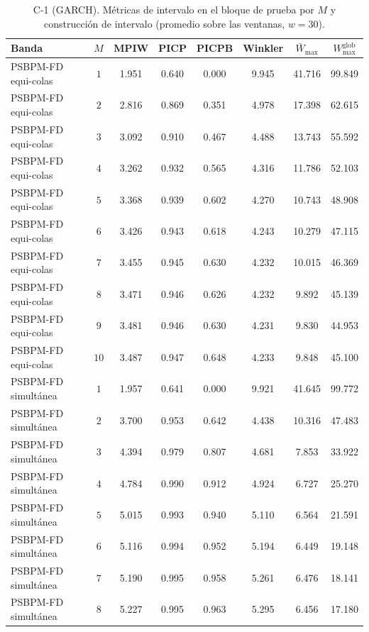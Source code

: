 \begin{table}[H]
\centering\footnotesize
\caption{C-1 (GARCH). Métricas de intervalo en el bloque de prueba por $M$ y construcción de intervalo (promedio sobre las ventanas, $w = 30$).}
\label{tab:aneB_B_C1}
\begin{tabular}{l c cccccc}
\hline
 Banda & $M$ & MPIW & PICP & PICPB & Winkler & $\bar{W}_{\max}$ & $W_{\max}^{\mathrm{glob}}$ \\
\hline
PSBPM-FD equi-colas & $1$ & 1.951 & 0.640 & 0.000 & 9.945 & 41.716 & 99.849 \\
PSBPM-FD equi-colas & $2$ & 2.816 & 0.869 & 0.351 & 4.978 & 17.398 & 62.615 \\
PSBPM-FD equi-colas & $3$ & 3.092 & 0.910 & 0.467 & 4.488 & 13.743 & 55.592 \\
PSBPM-FD equi-colas & $4$ & 3.262 & 0.932 & 0.565 & 4.316 & 11.786 & 52.103 \\
PSBPM-FD equi-colas & $5$ & 3.368 & 0.939 & 0.602 & 4.270 & 10.743 & 48.908 \\
PSBPM-FD equi-colas & $6$ & 3.426 & 0.943 & 0.618 & 4.243 & 10.279 & 47.115 \\
PSBPM-FD equi-colas & $7$ & 3.455 & 0.945 & 0.630 & 4.232 & 10.015 & 46.369 \\
PSBPM-FD equi-colas & $8$ & 3.471 & 0.946 & 0.626 & 4.232 & 9.892 & 45.139 \\
PSBPM-FD equi-colas & $9$ & 3.481 & 0.946 & 0.630 & 4.231 & 9.830 & 44.953 \\
PSBPM-FD equi-colas & $10$ & 3.487 & 0.947 & 0.648 & 4.233 & 9.848 & 45.100 \\
\hline
PSBPM-FD simultánea & $1$ & 1.957 & 0.641 & 0.000 & 9.921 & 41.645 & 99.772 \\
PSBPM-FD simultánea & $2$ & 3.700 & 0.953 & 0.642 & 4.438 & 10.316 & 47.483 \\
PSBPM-FD simultánea & $3$ & 4.394 & 0.979 & 0.807 & 4.681 & 7.853 & 33.922 \\
PSBPM-FD simultánea & $4$ & 4.784 & 0.990 & 0.912 & 4.924 & 6.727 & 25.270 \\
PSBPM-FD simultánea & $5$ & 5.015 & 0.993 & 0.940 & 5.110 & 6.564 & 21.591 \\
PSBPM-FD simultánea & $6$ & 5.116 & 0.994 & 0.952 & 5.194 & 6.449 & 19.148 \\
PSBPM-FD simultánea & $7$ & 5.190 & 0.995 & 0.958 & 5.261 & 6.476 & 18.141 \\
PSBPM-FD simultánea & $8$ & 5.227 & 0.995 & 0.963 & 5.295 & 6.456 & 17.180 \\

\end{tabular}
\end{table}
